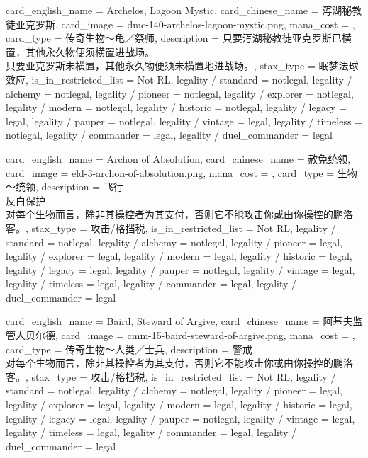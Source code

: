\documentclass[lang = cn, color = black, 10pt]{AllThatStax}
\begin{document}
\card
{
	card_english_name = {Archelos, Lagoon Mystic},
	card_chinese_name = {泻湖秘教徒亚克罗斯},
	card_image = dmc-140-archelos-lagoon-mystic.png,
	mana_cost = ,
	card_type = 传奇生物～龟／祭师,
	description = {只要泻湖秘教徒亚克罗斯已横置，其他永久物便须横置进战场。\\
只要亚克罗斯未横置，其他永久物便须未横置地进战场。},
	stax_type = 眠梦法球效应,
	is_in_restricted_list = Not RL,
	legality / standard = notlegal,
	legality / alchemy = notlegal,
	legality / pioneer = notlegal,
	legality / explorer = notlegal,
	legality / modern = notlegal,
	legality / historic = notlegal,
	legality / legacy = legal,
	legality / pauper = notlegal,
	legality / vintage = legal,
	legality / timeless = notlegal,
	legality / commander = legal,
	legality / duel_commander = legal
}

\card
{
	card_english_name = {Archon of Absolution},
	card_chinese_name = {赦免统领},
	card_image = eld-3-archon-of-absolution.png,
	mana_cost = ,
	card_type = 生物～统领,
	description = {飞行\\
反白保护\\
对每个生物而言，除非其操控者为其支付，否则它不能攻击你或由你操控的鹏洛客。},
	stax_type = 攻击/格挡税,
	is_in_restricted_list = Not RL,
	legality / standard = notlegal,
	legality / alchemy = notlegal,
	legality / pioneer = legal,
	legality / explorer = legal,
	legality / modern = legal,
	legality / historic = legal,
	legality / legacy = legal,
	legality / pauper = notlegal,
	legality / vintage = legal,
	legality / timeless = legal,
	legality / commander = legal,
	legality / duel_commander = legal
}

\card
{
	card_english_name = {Baird, Steward of Argive},
	card_chinese_name = {阿基夫监管人贝尔德},
	card_image = cmm-15-baird-steward-of-argive.png,
	mana_cost = ,
	card_type = 传奇生物～人类／士兵,
	description = {警戒\\
对每个生物而言，除非其操控者为其支付，否则它不能攻击你或由你操控的鹏洛客。},
	stax_type = 攻击/格挡税,
	is_in_restricted_list = Not RL,
	legality / standard = notlegal,
	legality / alchemy = notlegal,
	legality / pioneer = legal,
	legality / explorer = legal,
	legality / modern = legal,
	legality / historic = legal,
	legality / legacy = legal,
	legality / pauper = notlegal,
	legality / vintage = legal,
	legality / timeless = legal,
	legality / commander = legal,
	legality / duel_commander = legal
}
\end{document}
